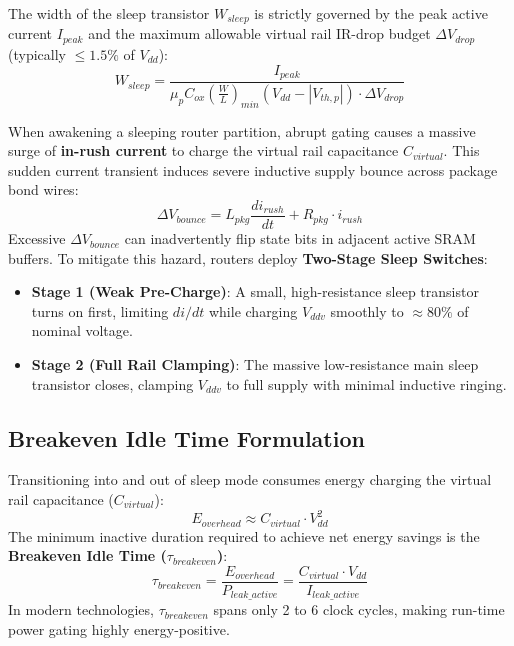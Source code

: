 The width of the sleep transistor $W_{sleep}$ is strictly governed by the peak active current $I_{peak}$ and the maximum allowable virtual rail IR-drop budget $\Delta V_{drop}$ (typically $\le 1.5\%$ of $V_{dd}$):
\begin{equation}
W_{sleep} = \frac{I_{peak}}{\mu_p C_{ox} \left(\frac{W}{L}\right)_{min} (V_{dd} - |V_{th, p}|) \cdot \Delta V_{drop}}
\label{eq:ch6_sleep_width}
\end{equation}

When awakening a sleeping router partition, abrupt gating causes a massive surge of \textbf{in-rush current} to charge the virtual rail capacitance $C_{virtual}$. This sudden current transient induces severe inductive supply bounce across package bond wires:
\begin{equation}
\Delta V_{bounce} = L_{pkg} \frac{d i_{rush}}{dt} + R_{pkg} \cdot i_{rush}
\label{eq:ch6_ground_bounce}
\end{equation}
Excessive $\Delta V_{bounce}$ can inadvertently flip state bits in adjacent active SRAM buffers. To mitigate this hazard, routers deploy \textbf{Two-Stage Sleep Switches}:
\begin{itemize}
    \item \textbf{Stage 1 (Weak Pre-Charge)}: A small, high-resistance sleep transistor turns on first, limiting $d i / dt$ while charging $V_{ddv}$ smoothly to $\approx 80\%$ of nominal voltage.
    \item \textbf{Stage 2 (Full Rail Clamping)}: The massive low-resistance main sleep transistor closes, clamping $V_{ddv}$ to full supply with minimal inductive ringing.
\end{itemize}

\subsection{Breakeven Idle Time Formulation}
Transitioning into and out of sleep mode consumes energy charging the virtual rail capacitance ($C_{virtual}$):
\begin{equation}
E_{overhead} \approx C_{virtual} \cdot V_{dd}^2
\label{eq:ch6_eoverhead}
\end{equation}
The minimum inactive duration required to achieve net energy savings is the \textbf{Breakeven Idle Time ($\tau_{breakeven}$)}:
\begin{equation}
\tau_{breakeven} = \frac{E_{overhead}}{P_{leak\_active}} = \frac{C_{virtual} \cdot V_{dd}}{I_{leak\_active}}
\label{eq:ch6_breakeven}
\end{equation}
In modern technologies, $\tau_{breakeven}$ spans only 2 to 6 clock cycles, making run-time power gating highly energy-positive.

